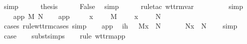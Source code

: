 \begin{isabellebody}
\ simp\isanewline
\isanewline
\ \ \ \ \isamarkupfalse%
\ {\isacharquery}thesis\isanewline
\ \ \ \ \isamarkupfalse%
\ False\ \isamarkupfalse%
\ simp\isanewline
\ \ \ \ \isamarkupfalse%
\ {\isacharparenleft}rule{\isacharunderscore}tac\ wt{\isacharunderscore}trm{\isachardot}var{\isacharparenright}\isanewline
\ \ \ \ \isamarkupfalse%
\ {}\ {}\ \isamarkupfalse%
\ simp{\isacharplus}\isanewline
\ \ \isamarkupfalse%
\isanewline
{}\isamarkupfalse%
\isanewline
{}\isamarkupfalse%
\ {\isacharparenleft}app\ M{\isacharprime}\ N{\isacharprime}{\isacharparenright}\isanewline
\ \ \isamarkupfalse%
\ app{\isacharparenleft}{}{\isacharparenright}\ \isamarkupfalse%
\ {\isasympi}\ \ \ {\isachardoublequoteopen}{\isacharparenleft}x{\isacharcomma}\ {\isasymtau}{\isacharparenright}\ {\isacharhash}\ {\isasymGamma}\ {\isasymturnstile}\ M{\isacharprime}\ {\isacharcolon}\ {\isasympi}\ {\isasymrightarrow}\ {\isasymsigma}{\isachardoublequoteclose}\ {\isachardoublequoteopen}{\isacharparenleft}x{\isacharcomma}\ {\isasymtau}{\isacharparenright}\ {\isacharhash}\ {\isasymGamma}\ {\isasymturnstile}\ N{\isacharprime}\ {\isacharcolon}\ {\isasympi}{\isachardoublequoteclose}\ \isanewline
\ \ \ \ \isamarkupfalse%
\ {\isacharparenleft}cases\ rule{\isacharcolon}wt{\isacharunderscore}trm{\isachardot}cases{\isacharcomma}\ simp{\isacharparenright}\isanewline
\ \ \isamarkupfalse%
\ app{\isacharparenleft}{}{\isacharcomma}{}{\isacharcomma}{}{\isacharparenright}\ \isamarkupfalse%
\ ih{\isacharcolon}\ {\isachardoublequoteopen}{\isasymGamma}\ {\isasymturnstile}\ M{\isacharprime}{\isacharbrackleft}x\ {\isacharcolon}{\isacharcolon}{\isacharequal}\ N{\isacharbrackright}\ {\isacharcolon}\ {\isasympi}\ {\isasymrightarrow}\ {\isasymsigma}{\isachardoublequoteclose}\ {\isachardoublequoteopen}{\isasymGamma}\ {\isasymturnstile}\ N{\isacharprime}{\isacharbrackleft}x\ {\isacharcolon}{\isacharcolon}{\isacharequal}\ N{\isacharbrackright}\ {\isacharcolon}\ {\isasympi}{\isachardoublequoteclose}\ \isamarkupfalse%
\ simp{\isacharplus}\isanewline
\ \ \isamarkupfalse%
\ {\isacharquery}case\isanewline
\ \ \isamarkupfalse%
\ subst{\isachardot}simps\isanewline
\ \ \isamarkupfalse%
\ {\isacharparenleft}rule\ wt{\isacharunderscore}trm{\isachardot}app{\isacharparenright}\isanewline

\end{isabellebody}
